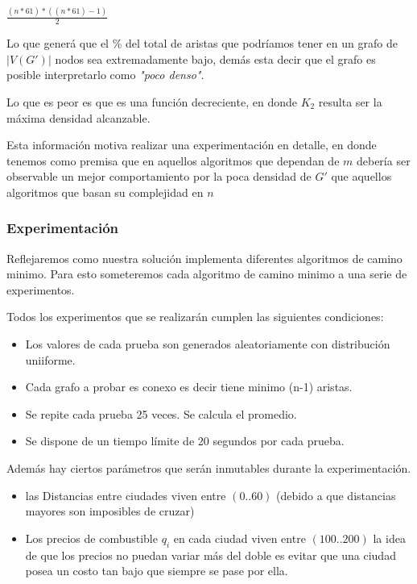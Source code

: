 \documentclass[12pt]{article}
\begin{document}
\begin{center}
$\frac{(n * 61) *((n * 61) - 1)}{2}$
\end{center}

Lo que generá que el \% del total de aristas que podríamos tener en un grafo de $|V(G')|$ nodos sea extremadamente bajo, demás esta decir que el grafo es posible interpretarlo como \textit{"poco denso"}.

Lo que es peor es que es una función decreciente, en donde $K_2$ resulta ser la máxima densidad alcanzable.

Esta información motiva realizar una experimentación en detalle, en donde tenemos como premisa que en aquellos algoritmos que dependan de $m$ debería ser observable un mejor comportamiento por la poca densidad de $G'$ que aquellos algoritmos que basan su complejidad en $n$


\subsubsection{Experimentación}

Reflejaremos como nuestra solución implementa diferentes algoritmos de camino minimo. Para esto someteremos cada algoritmo de camino minimo a una serie de experimentos.

Todos los experimentos que se realizarán cumplen las siguientes condiciones:
\begin{itemize}
	\item Los valores de cada prueba son generados aleatoriamente con distribución uniiforme.
	\item Cada grafo a probar es conexo es decir tiene minimo (n-1) aristas.
	\item Se repite cada prueba 25 veces. Se calcula el promedio.
	\item Se dispone de un tiempo límite de 20 segundos por cada prueba.
\end{itemize}

Además hay ciertos parámetros que serán inmutables durante la experimentación.

\begin{itemize}
	\item las Distancias entre ciudades viven entre $(0..60)$ (debido a que distancias mayores son imposibles de cruzar) 
	\item Los precios de combustible $q_i$ en cada ciudad viven entre $(100..200)$ la idea de que los precios no puedan variar más del doble es evitar que una ciudad posea un costo tan bajo que siempre se pase por ella.
\end{itemize}
\end{document}
